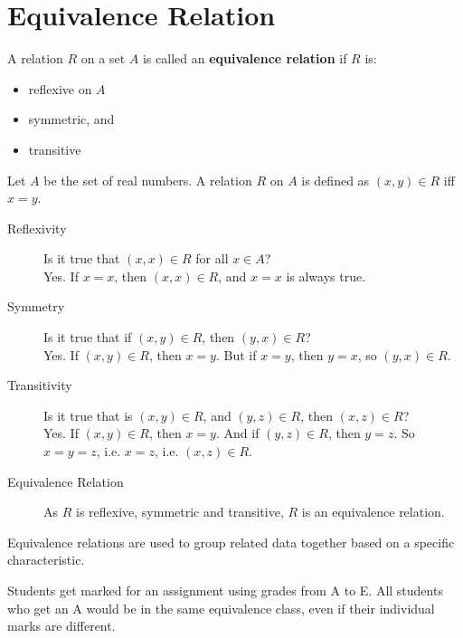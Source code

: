 \documentclass[../notes.tex]{subfiles}
\begin{document}
		\section{Equivalence Relation}
			A relation $R$ on a set $A$ is called an \textbf{equivalence relation} if $R$ is:
			\begin{itemize}
				\item reflexive on $A$
				\item symmetric, and
				\item transitive
			\end{itemize}
			\begin{example}
				Let $A$ be the set of real numbers. A relation $R$ on $A$ is defined as $(x, y) \in R$ iff $x = y$.
				\begin{description}
					\item[Reflexivity] Is it true that $(x, x) \in R$ for all $x \in A$?\\
						Yes. If $x = x$, then $(x, x) \in R$, and $x = x$ is always true.
					\item[Symmetry] Is it true that if $(x, y) \in R$, then $(y, x) \in R$?\\
						Yes. If $(x, y) \in R$, then $x = y$. But if $x = y$, then $y = x$, so $(y, x) \in R$.
					\item[Transitivity] Is it true that is $(x, y) \in R$, and $(y, z) \in R$, then $(x, z) \in R$?\\
						Yes. If $(x, y) \in R$, then $x = y$. And if $(y, z) \in R$, then $y = z$. So $x = y = z$, i.e. $x = z$, i.e. $(x, z) \in R$.
					\item[Equivalence Relation] As $R$ is reflexive, symmetric and transitive, $R$ is an equivalence relation.
				\end{description} 
			\end{example}
			Equivalence relations are used to group related data together based on a specific characteristic.
			\begin{example}
				Students get marked for an assignment using grades from A to E. All students who get an A would be in the same equivalence class, even if their individual marks are different.
			\end{example}
\end{document}
